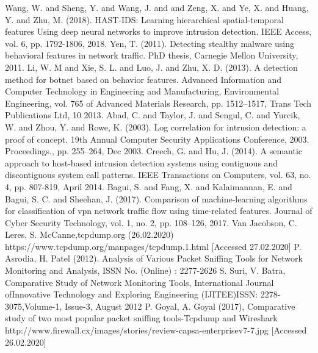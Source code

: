 \documentclass[conference]{IEEEtran}
\begin{document}
\begin{thebibliography}{00}
 Wang, W. and Sheng, Y. and Wang, J. and and Zeng, X. and Ye, X. and Huang, Y. and Zhu, M. (2018). HAST-IDS: Learning hierarchical spatial-temporal features Using deep neural networks to improve intrusion detection. IEEE Access, vol. 6, pp. 1792-1806, 2018.
 Yen, T. (2011). Detecting stealthy malware using behavioral features in network traffic. PhD thesis, Carnegie Mellon University, 2011.
 Li, W. M and Xie, S. L. and Luo, J. and Zhu, X. D. (2013). A detection method for botnet based on behavior features. Advanced Information and Computer Technology in Engineering and Manufacturing, Environmental Engineering, vol. 765 of Advanced Materials Research, pp. 1512–1517, Trans Tech Publications Ltd, 10 2013.
 Abad, C. and Taylor, J. and Sengul, C.  and Yurcik, W. and Zhou, Y. and Rowe, K. (2003). Log correlation for intrusion detection: a proof of concept. 19th Annual Computer Security Applications Conference, 2003. Proceedings., pp. 255–264, Dec 2003.
 Creech, G. and Hu, J. (2014). A semantic approach to host-based intrusion detection systems using contiguous and discontiguous system call patterns. IEEE Transactions on Computers, vol. 63, no. 4, pp. 807-819, April 2014.
 Bagui, S. and Fang, X. and Kalaimannan, E. and Bagui, S. C. and Sheehan, J. (2017). Comparison of machine-learning algorithms for classification of vpn network traffic flow using time-related features. Journal of Cyber Security Technology, vol. 1, no. 2, pp. 108–126, 2017.
 Van Jacobson, C. Leres, S. McCanne,tcpdump.org (26.02.2020) https://www.tcpdump.org/manpages/tcpdump.1.html [Accessed 27.02.2020]
 P. Asrodia, H. Patel (2012). Analysis  of  Various  Packet  Sniffing  Tools  for Network  Monitoring  and  Analysis, ISSN  No.  (Online)  :  2277-2626
 S. Suri, V. Batra, Comparative Study of Network Monitoring Tools, International Journal ofInnovative Technology and Exploring Engineering (IJITEE)ISSN: 2278-3075,Volume-1, Issue-3, August 2012
 P. Goyal, A. Goyal (2017), Comparative study of two most popular packet sniffing tools-Tcpdump and Wireshark
 http://www.firewall.cx/images/stories/review-capsa-enterprisev7-7.jpg [Accessed 26.02.2020]
\end{thebibliography}


\vspace{12pt}
\color{red}
\end{document}
